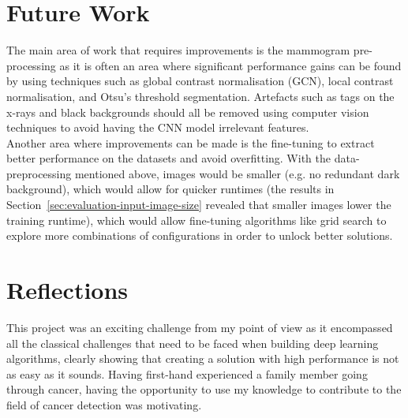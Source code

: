 
\section{Future Work}

The main area of work that requires improvements is the mammogram pre-processing as it is often an area where significant performance gains can be found \citep{Litjens2017} by using techniques such as global contrast normalisation (GCN), local contrast normalisation, and Otsu’s threshold segmentation. Artefacts such as tags on the x-rays and black backgrounds should all be removed using computer vision techniques to avoid having the CNN model irrelevant features.\\

Another area where improvements can be made is the fine-tuning to extract better performance on the datasets and avoid overfitting. With the data-preprocessing mentioned above, images would be smaller (e.g. no redundant dark background), which would allow for quicker runtimes (the results in Section~\ref{sec:evaluation-input-image-size} revealed that smaller images lower the training runtime), which would allow fine-tuning algorithms like grid search to explore more combinations of configurations in order to unlock better solutions.
    

\section{Reflections}

This project was an exciting challenge from my point of view as it encompassed all the classical challenges that need to be faced when building deep learning algorithms, clearly showing that creating a solution with high performance is not as easy as it sounds. Having first-hand experienced a family member going through cancer, having the opportunity to use my knowledge to contribute to the field of cancer detection was motivating.